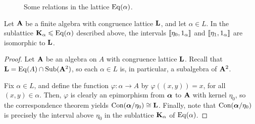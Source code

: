 \begin{figure}[h!]
  \centering
{
}
\caption{Some relations in the lattice $\operatorname{Eq}(\alpha)$.}
\label{fig:1}
\end{figure}


\medskip


\begin{prop}
Let $\mathbf{A}$ be a finite algebra with
congruence lattice $\mathbf{L}$, and let $\alpha \in L$.
In the sublattice $\mathbf{K}_\alpha \leqslant \operatorname{Eq}(\alpha)$ described above, 
the intervals $\llbracket \eta_0, 1_\alpha\rrbracket$ and
$\llbracket \eta_1, 1_\alpha\rrbracket$ are isomorphic to $\mathbf{L}$.
\end{prop}

\begin{proof}
Let $\mathbf{A}$ be an algebra on $A$ with congruence
lattice $\mathbf{L}$. 
Recall that $\mathbf{L} = \operatorname{Eq}(A) \cap \operatorname{Sub}(\mathbf{A}^2)$, so each $\alpha\in L$ is, in
particular, a subalgebra of $\mathbf{A}^2$.  

Fix $\alpha \in L$, and define the function
$\varphi:\alpha \rightarrow A$ by $\varphi((x, y)) = x$, for all 
$(x,y) \in \alpha$. Then, $\varphi$ is clearly an epimorphism from $\boldsymbol{\alpha}$ to
$\mathbf{A}$ with kernel $\eta_0$, so the correspondence theorem yields
$\operatorname{Con}(\boldsymbol{\alpha}/\eta_0) \cong \mathbf{L}$.
Finally, note that $\operatorname{Con}(\boldsymbol{\alpha}/\eta_0)$ is precisely the interval
above $\eta_0$ in the sublattice $\mathbf{K}_\alpha$ of $\operatorname{Eq}(\alpha)$.
\end{proof}


